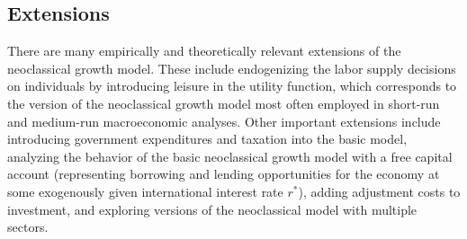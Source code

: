 \documentclass[\topdir/lecture\_notes.tex]{subfiles}
\begin{document}


\subsection{Extensions}
There are many empirically and theoretically relevant extensions of the neoclassical growth model. These include endogenizing the labor supply decisions on individuals by introducing leisure in the utility function, which corresponds to the version of the neoclassical growth model most often employed in short-run and medium-run macroeconomic analyses. Other important extensions include introducing government expenditures and taxation into the basic model, analyzing the behavior of the basic neoclassical growth model with a free capital account (representing borrowing and lending opportunities for the economy at some exogenously given international interest rate $r^{*}$), adding adjustment costs to investment, and exploring versions of the neoclassical model with multiple sectors.
\end{document}
